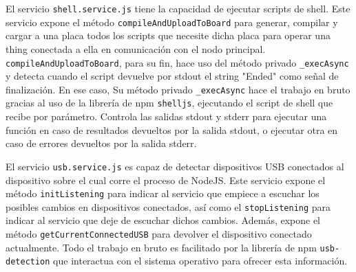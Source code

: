 \vspace{1cm}
 
El servicio \verb|shell.service.js| tiene la capacidad de ejecutar scripts de shell. Este servicio expone el método \verb|compileAndUploadToBoard| para generar, compilar y cargar a una placa todos los scripts que necesite dicha placa para operar una thing conectada a ella en comunicación con el nodo principal. \verb|compileAndUploadToBoard|, para su fin, hace uso del método privado \verb|_execAsync| y detecta cuando el script devuelve por stdout el string "Ended" como señal de finalización. En ese caso, 
Su método privado \verb|_execAsync| hace el trabajo en bruto gracias al uso de la librería de npm \verb|shelljs|, ejecutando el script de shell que recibe por parámetro. Controla las salidas stdout y stderr para ejecutar una función en caso de resultados devueltos por la salida stdout, o ejecutar otra en caso de errores devueltos por la salida stderr.

\vspace{1cm}

El servicio \verb|usb.service.js| es capaz de detectar dispositivos USB conectados al dispositivo sobre el cual corre el proceso de NodeJS.
Este servicio expone el método \verb|initListening| para indicar al servicio que empiece a escuchar los posibles cambios en dispositivos conectados, así como el \verb|stopListening| para indicar al servicio que deje de escuchar dichos cambios. Además, expone el método \verb|getCurrentConnectedUSB| para devolver el dispositivo conectado actualmente. Todo el trabajo en bruto es facilitado por la librería de npm  \verb|usb-detection| que interactua con el sistema operativo para ofrecer esta información.
